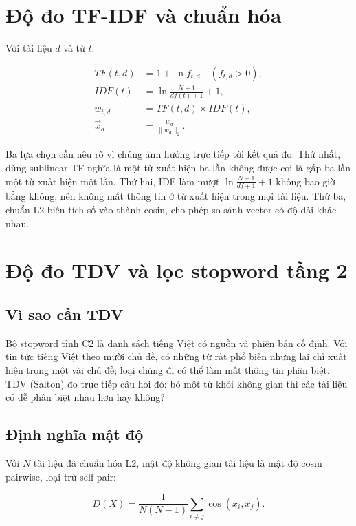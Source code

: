 \section{Độ đo TF-IDF và chuẩn hóa}

Với tài liệu $d$ và từ $t$:

\begin{align}
TF(t,d) &= 1+\ln f_{t,d} \quad (f_{t,d}>0), \\
IDF(t) &= \ln\frac{N+1}{df(t)+1}+1, \\
w_{t,d} &= TF(t,d)\times IDF(t), \\
\vec{x}_d &= \frac{w_d}{\lVert w_d\rVert_2}.
\end{align}

Ba lựa chọn cần nêu rõ vì chúng ảnh hưởng trực tiếp tới kết quả đo. Thứ nhất,
dùng sublinear TF nghĩa là một từ xuất hiện ba lần không được coi là gấp ba lần
một từ xuất hiện một lần. Thứ hai, IDF làm mượt $\ln\frac{N+1}{df+1}+1$ không bao
giờ bằng không, nên không mất thông tin ở từ xuất hiện trong mọi tài liệu. Thứ
ba, chuẩn L2 biến tích số vào thành cosin, cho phép so sánh vector có độ dài
khác nhau.

\section{Độ đo TDV và lọc stopword tầng 2}

\subsection{Vì sao cần TDV}

Bộ stopword tĩnh C2 là danh sách tiếng Việt có nguồn và phiên bản cố định. Với
tin tức tiếng Việt theo mười chủ đề, có những từ rất phổ biến nhưng lại chỉ xuất
hiện trong một vài chủ đề; loại chúng đi có thể làm mất thông tin phân biệt. TDV
(Salton) đo trực tiếp câu hỏi đó: bỏ một từ khỏi không gian thì các tài liệu có
dễ phân biệt nhau hơn hay không?

\subsection{Định nghĩa mật độ}

Với $N$ tài liệu đã chuẩn hóa L2, mật độ không gian tài liệu là mật độ cosin
pairwise, loại trừ self-pair:

\begin{equation}
D(X)=\frac{1}{N(N-1)}\sum_{i\neq j}\cos(x_i,x_j).
\end{equation}

